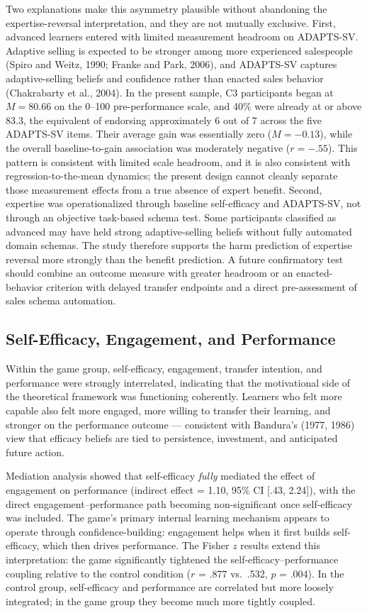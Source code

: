 \documentclass[12pt]{report}
\begin{document}
Two explanations make this asymmetry plausible without abandoning the expertise-reversal interpretation, and they are not mutually exclusive. First, advanced learners entered with limited measurement headroom on ADAPTS-SV. Adaptive selling is expected to be stronger among more experienced salespeople (Spiro and Weitz, 1990; Franke and Park, 2006), and ADAPTS-SV captures adaptive-selling beliefs and confidence rather than enacted sales behavior (Chakrabarty et al., 2004). In the present sample, C3 participants began at $M = 80.66$ on the 0--100 pre-performance scale, and 40\% were already at or above 83.3, the equivalent of endorsing approximately 6 out of 7 across the five ADAPTS-SV items. Their average gain was essentially zero ($M = -0.13$), while the overall baseline-to-gain association was moderately negative ($r = -.55$). This pattern is consistent with limited scale headroom, and it is also consistent with regression-to-the-mean dynamics; the present design cannot cleanly separate those measurement effects from a true absence of expert benefit. Second, expertise was operationalized through baseline self-efficacy and ADAPTS-SV, not through an objective task-based schema test. Some participants classified as advanced may have held strong adaptive-selling beliefs without fully automated domain schemas. The study therefore supports the harm prediction of expertise reversal more strongly than the benefit prediction. A future confirmatory test should combine an outcome measure with greater headroom or an enacted-behavior criterion with delayed transfer endpoints and a direct pre-assessment of sales schema automation.

\subsection{Self-Efficacy, Engagement, and Performance}
Within the game group, self-efficacy, engagement, transfer intention, and performance were strongly interrelated, indicating that the motivational side of the theoretical framework was functioning coherently. Learners who felt more capable also felt more engaged, more willing to transfer their learning, and stronger on the performance outcome --- consistent with Bandura's (1977, 1986) view that efficacy beliefs are tied to persistence, investment, and anticipated future action.

Mediation analysis showed that self-efficacy \textit{fully} mediated the effect of engagement on performance (indirect effect = 1.10, 95\% CI [.43, 2.24]), with the direct engagement--performance path becoming non-significant once self-efficacy was included. The game's primary internal learning mechanism appears to operate through confidence-building: engagement helps when it first builds self-efficacy, which then drives performance. The Fisher $z$ results extend this interpretation: the game significantly tightened the self-efficacy--performance coupling relative to the control condition ($r$ = .877 vs.\ .532, $p$ = .004). In the control group, self-efficacy and performance are correlated but more loosely integrated; in the game group they become much more tightly coupled.
\end{document}
